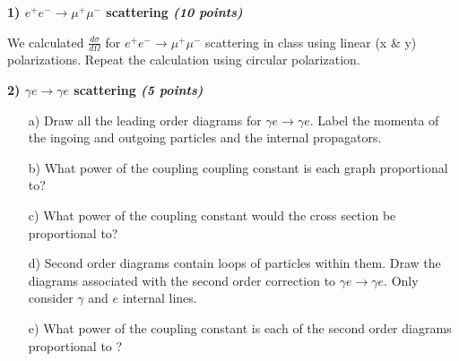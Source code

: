 {\large

\textbf{1) $e^+ e^- \rightarrow \mu^+ \mu^-$ scattering   \hfill \textit{(10 points)} }

We calculated $\frac{d\sigma}{d\Omega}$ for $e^+ e^- \rightarrow \mu^+ \mu^-$ scattering in class using linear (x \& y) polarizations.
Repeat the calculation using circular polarization. 


\vspace*{0.25in}

\textbf{2)  $\gamma e \rightarrow \gamma e$ scattering \hfill \textit{(5 points)}}

\begin{itemize}

\item[a)]{ Draw all the leading order diagrams for $\gamma e \rightarrow \gamma e$.  
Label the momenta of the ingoing and outgoing particles and the internal propagators.
}
\item[b)]{What power of the coupling coupling constant is each graph proportional to?
}
\item[c)]{
What power of the coupling constant would the cross section be proportional to?
}
\item[d)]{
Second order diagrams contain loops of particles within them.  Draw the diagrams associated with the second order correction to $\gamma e \rightarrow \gamma e$.
Only consider $\gamma$ and $e$ internal lines. 
}
\item[e)]{
What power of the coupling constant is each of the second order diagrams proportional to ?
}
\end{itemize}


}






